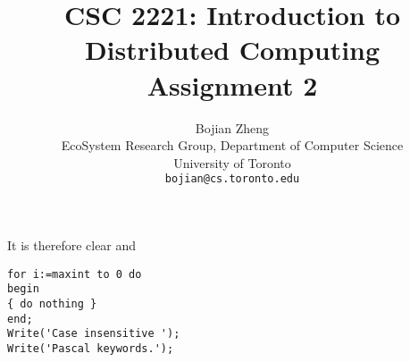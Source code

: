 \documentclass{article}
\title{CSC 2221: Introduction to Distributed Computing \\
    Assignment 2}
\author{
  Bojian Zheng \\
  EcoSystem Research Group, Department of Computer Science \\
  University of Toronto \\
  \texttt{bojian@cs.toronto.edu} \\
}
\begin{document}
\maketitle

It is therefore clear and 

\begin{lstlisting}[frame=single]  % Start your code-block
for i:=maxint to 0 do
begin
{ do nothing }
end;
Write('Case insensitive ');
Write('Pascal keywords.');
\end{lstlisting}

% 
\end{document}
